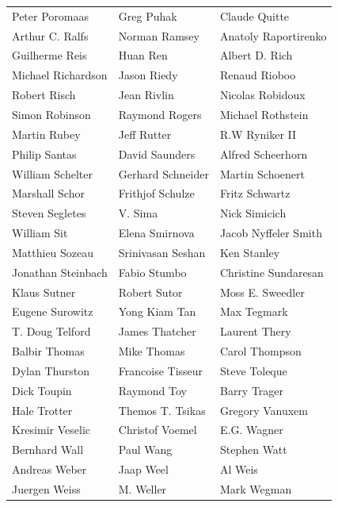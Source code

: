 \begin{tabular}{lll}
Peter Poromaas         & Greg Puhak             & Claude Quitte\\
Arthur C. Ralfs        & Norman Ramsey          & Anatoly Raportirenko\\
Guilherme Reis         & Huan Ren               & Albert D. Rich\\
Michael Richardson     & Jason Riedy            & Renaud Rioboo\\
Robert Risch           & Jean Rivlin            & Nicolas Robidoux\\
Simon Robinson         & Raymond Rogers         & Michael Rothstein\\
Martin Rubey           & Jeff Rutter            & R.W Ryniker II\\
Philip Santas          & David Saunders         & Alfred Scheerhorn\\
William Schelter       & Gerhard Schneider      & Martin Schoenert\\
Marshall Schor         & Frithjof Schulze       & Fritz Schwartz\\
Steven Segletes        & V. Sima                & Nick Simicich\\
William Sit            & Elena Smirnova         & Jacob Nyffeler Smith\\
Matthieu Sozeau        & Srinivasan Seshan      & Ken Stanley\\
Jonathan Steinbach     & Fabio Stumbo           & Christine Sundaresan\\
Klaus Sutner           & Robert Sutor           & Moss E. Sweedler\\
Eugene Surowitz        & Yong Kiam Tan          & Max Tegmark\\
T. Doug Telford        & James Thatcher         & Laurent Thery\\
Balbir Thomas          & Mike Thomas            & Carol Thompson\\
Dylan Thurston         & Francoise Tisseur      & Steve Toleque\\
Dick Toupin            & Raymond Toy            & Barry Trager\\
Hale Trotter           & Themos T. Tsikas       & Gregory Vanuxem\\
Kresimir Veselic       & Christof Voemel        & E.G. Wagner\\
Bernhard Wall          & Paul Wang              & Stephen Watt\\
Andreas Weber          & Jaap Weel              & Al Weis\\
Juergen Weiss          & M. Weller              & Mark Wegman\\

\end{tabular}
